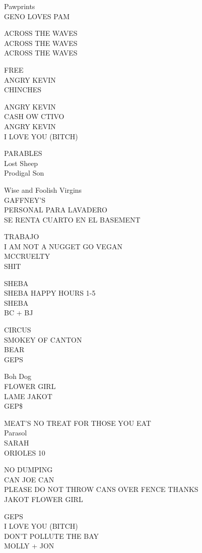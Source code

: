 \documentclass[10pt,letterpaper]{article}
\begin{document}
Pawprints\\
GENO LOVES PAM

ACROSS THE WAVES\\
ACROSS THE WAVES\\
ACROSS THE WAVES

FREE\\
ANGRY KEVIN\\
CHINCHES

ANGRY KEVIN\\
CASH OW CTIVO\\
ANGRY KEVIN\\
I LOVE YOU (BITCH)

PARABLES\\
Lost Sheep\\
Prodigal Son

Wise and Foolish Virgins\\
GAFFNEY'S\\
PERSONAL PARA LAVADERO\\
SE RENTA CUARTO EN EL BASEMENT

TRABAJO\\
I AM NOT A NUGGET GO VEGAN\\
MCCRUELTY\\
SHIT

SHEBA\\
SHEBA HAPPY HOURS 1{-}5\\
SHEBA\\
BC + BJ

CIRCUS\\
SMOKEY OF CANTON\\
BEAR\\
GEPS

Boh Dog\\
FLOWER GIRL\\
LAME JAKOT\\
GEP\$

MEAT'S NO TREAT FOR THOSE YOU EAT\\
Parasol\\
SARAH\\
ORIOLES 10

NO DUMPING\\
CAN JOE CAN\\
PLEASE DO NOT THROW CANS OVER FENCE THANKS\\
JAKOT FLOWER GIRL

GEPS\\
I LOVE YOU (BITCH)\\
DON'T POLLUTE THE BAY\\
MOLLY + JON
\end{document}
